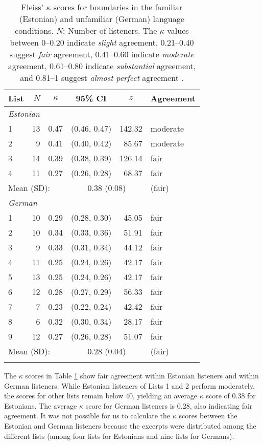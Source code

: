 \documentclass[output=paper]{langscibook}
\begin{document}
\begin{table}%
    \caption{Fleiss’ $\kappa$ scores for boundaries in the familiar (Estonian) and unfamiliar (German) language conditions. $N$: Number of listeners. The $\kappa$ values between 0--0.20 indicate \textit{slight} agreement, 0.21--0.40 suggest \textit{fair} agreement, 0.41--0.60 indicate \textit{moderate} agreement, 0.61--0.80 indicate \textit{substantial} agreement, and 0.81--1 suggest \textit{almost perfect} agreement \citep[see][]{landisKoch1977}.}
    \label{tab:2:irr}
	    \begin{tabular}{l r cc r l}
		    \lsptoprule
		   List	&	$N$	&	$\kappa$	&	95\% CI	&\multicolumn{1}{c}{$z$}	& Agreement\\\midrule
			\multicolumn{3}{l}{\itshape Estonian}\\
			1	&	13	&	0.47	&	(0.46, 0.47)	&	142.32	& moderate\\
		    2	&	9	&	0.41	&	(0.40, 0.42)	   &	85.67	& moderate \\
			3	&	14	&	0.39	&	(0.38, 0.39)	&	126.14	& fair \\
			4	&	11	&	0.27	&	(0.26, 0.28)	&	68.37	& fair \\\midrule
			\multicolumn{3}{l}{Mean (SD):} & \multicolumn{2}{c}{0.38 (0.08)}  & {(fair)} \\
		    \midrule
			\multicolumn{3}{l}{\itshape German}\\
		    1	&	10	&	0.29	&	(0.28, 0.30)	&	45.05	& fair\\
		    2	&	10	&	0.34	&	(0.33, 0.36)	&	51.91	& fair\\
		    3	&	9	&	0.33	&	(0.31, 0.34)	&	44.12	& fair\\
		    4	&	11	&	0.25	&	(0.24, 0.26)	&	42.17	& fair\\
		    5	&	13	&	0.25	&	(0.24, 0.26)	&	42.17	& fair\\
		    6	&	12	&	0.28	&	(0.27, 0.29)	&	56.33	& fair\\
			7	&	7	&	0.23	&	(0.22, 0.24)	&	42.42	& fair\\
			8	&	6	&	0.32	&	(0.30, 0.34)	&	28.17	& fair\\
			9	&	12	&	0.27	&	(0.26, 0.28)	&	51.07	& fair\\\midrule
			\multicolumn{3}{l}{Mean (SD):} & \multicolumn{2}{c}{0.28 (0.04)} &	{(fair)}\\
		    \lspbottomrule
	    \end{tabular}
\end{table}

    The $\kappa$ scores in Table \ref{tab:2:irr} show fair agreement within Estonian listeners and within German listeners. While Estonian listeners of Lists 1 and 2 perform moderately, the scores for other lists remain below 40, yielding an average $\kappa$ score of 0.38 for Estonians. The average $\kappa$ score for German listeners is 0.28, also indicating fair agreement. It was not possible for us to calculate the $\kappa$ scores between the Estonian and German listeners because the excerpts were distributed among the different lists (among four lists for Estonians and nine lists for Germans).
    
\end{document}
